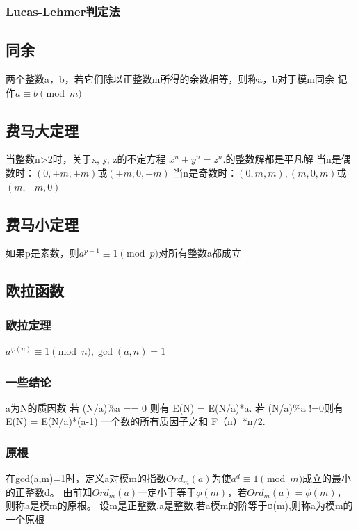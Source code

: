\documentclass[a4paper]{article}
\begin{document}
\begin{CJK*}{UTF8}{gbsn}
\begin{multicols}{3}
\begin{flushleft}
\subsubsection{Lucas-Lehmer判定法}


\subsection{同余}
两个整数a，b，若它们除以正整数m所得的余数相等，则称a，b对于模m同余
记作$a \equiv b \pmod{m}$


\subsection{费马大定理}
当整数n>2时，关于x, y, z的不定方程 $x^n + y^n =z^n$.的整数解都是平凡解
当n是偶数时：$(0,\pm m,\pm m)$或$(\pm m,0,\pm m)$
当n是奇数时：$(0,m,m), (m,0,m)$或$(m,-m,0)$



\subsection{费马小定理}
如果p是素数，则$a^{p-1} \equiv  1 \pmod{p}$对所有整数a都成立


\subsection{欧拉函数}

\subsubsection{欧拉定理}
$a^{\varphi(n)} \equiv 1 \pmod n, \gcd(a,n)=1$

\subsubsection{一些结论}
a为N的质因数
若 (N/a)\%a == 0 则有 E(N) = E(N/a)*a.
若 (N/a)\%a !=0则有 E(N) = E(N/a)*(a-1)
一个数的所有质因子之和 F（n）*n/2.


\subsubsection{原根}
在gcd(a,m)=1时，定义a对模m的指数$Ord_m(a)$为使$a^d \equiv 1 \pmod{m}$成立的最小的正整数d。
由前知$Ord_m(a) $一定小于等于$  \phi (m)$，若$Ord_m (a) = \phi (m)$，则称a是模m的原根。
设m是正整数,a是整数,若a模m的阶等于φ(m),则称a为模m的一个原根


\end{flushleft}
\end{multicols}
\end{CJK*}
\end{document}
